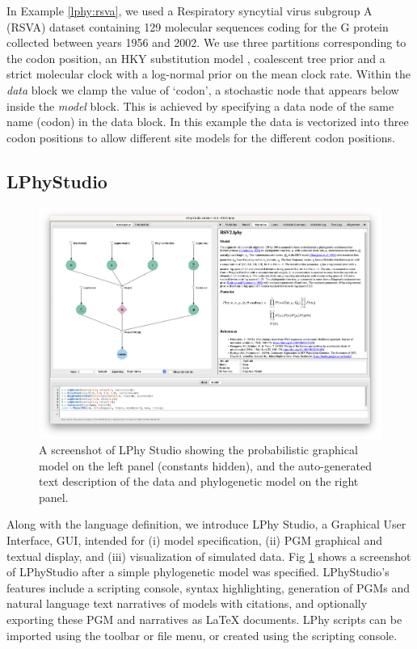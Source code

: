 \documentclass[10pt,letterpaper,table]{article}
\theoremstyle{definition}
\begin{document}
In Example \ref{lphy:rsva}, we used a Respiratory syncytial virus subgroup A (RSVA) dataset \cite{zlateva2004molecular, zlateva2005genetic} containing 129 molecular sequences coding for the G protein collected between years 1956 and 2002. 
We use three partitions corresponding to the codon position, an HKY substitution model \cite{hasegawa1985dating}, coalescent tree prior \cite{kingman82} and a strict molecular clock with a log-normal prior on the mean clock rate. 
Within the \textit{data} block we clamp the value of `codon', a stochastic node that appears below inside the \textit{model} block. 
This is achieved by specifying a data node of the same name (codon) in the data block. 
In this example the data is vectorized into three codon positions to allow different site models for the different codon positions.

\subsection{LPhyStudio} 
\begin{figure}[!h]
  \includegraphics[width=\textwidth]{figs_plos/Fig2.png}
  \caption{A screenshot of LPhy Studio showing the probabilistic graphical model 
  on the left panel (constants hidden), and the auto-generated text description of the data and phylogenetic model on the right panel.} 
  \label{fig:lphystudio}
\end{figure}
Along with the language definition, we introduce LPhy Studio, a Graphical User Interface, GUI, intended for (i) model specification, (ii) PGM graphical and textual display, and (iii) visualization of simulated data.
Fig \ref{fig:lphystudio} shows a screenshot of LPhyStudio after a simple phylogenetic model was specified. 
LPhyStudio's features include a scripting console, syntax highlighting, generation of PGMs and natural language text narratives of models with citations, and optionally exporting these PGM and narratives as LaTeX documents. 
LPhy scripts can be imported using the toolbar or file menu, or created using the scripting console. 
\end{document}
